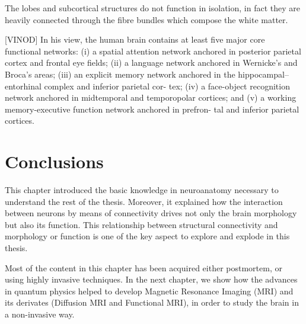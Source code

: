 The lobes and subcortical structures do not function in isolation, in fact they are heavily connected through the fibre bundles which compose the white matter.

[VINOD]
In his view, the human brain contains at least five major core functional networks: (i) a spatial attention network anchored in posterior parietal cortex and frontal eye fields;
(ii) a language network anchored in Wernicke’s and Broca’s areas; (iii) an explicit memory network anchored in the hippocampal–entorhinal complex and inferior parietal cor- tex; (iv) a face-object recognition network anchored in
midtemporal and temporopolar cortices; and (v) a working memory-executive function network anchored in prefron- tal and inferior parietal cortices. 

\section{Conclusions}
This chapter introduced the basic knowledge in neuroanatomy necessary to
understand the rest of the thesis. Moreover, it explained how the interaction
between neurons by means of connectivity drives not only the brain morphology
but also its function. This relationship between structural connectivity and 
morphology or function is one of the key aspect to explore and explode in this
thesis.

Most of the content in this chapter has been acquired either postmortem, or
using highly invasive techniques. In the next chapter, we show how the advances
in quantum physics helped to develop Magnetic Resonance Imaging (MRI) and its
derivates (Diffusion MRI and Functional MRI), in order to study the brain in a
non-invasive way.


\chapterbib
